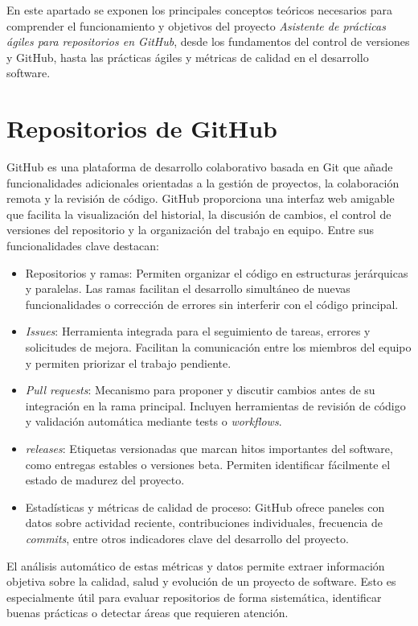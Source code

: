 
En este apartado se exponen los principales conceptos teóricos necesarios para comprender el funcionamiento y objetivos del proyecto \textit{Asistente de prácticas ágiles para repositorios en GitHub}, desde los fundamentos del control de versiones y GitHub, hasta las prácticas ágiles y métricas de calidad en el desarrollo software.

\section{Repositorios de GitHub}

GitHub es una plataforma de desarrollo colaborativo basada en Git que añade funcionalidades adicionales orientadas a la gestión de proyectos, la colaboración remota y la revisión de código. GitHub proporciona una interfaz web amigable que facilita la visualización del historial, la discusión de cambios, el control de versiones del repositorio y la organización del trabajo en equipo. Entre sus funcionalidades clave destacan:

\begin{itemize}
\item Repositorios y ramas: Permiten organizar el código en estructuras jerárquicas y paralelas. Las ramas facilitan el desarrollo simultáneo de nuevas funcionalidades o corrección de errores sin interferir con el código principal.
\item \textit{Issues}: Herramienta integrada para el seguimiento de tareas, errores y solicitudes de mejora. Facilitan la comunicación entre los miembros del equipo y permiten priorizar el trabajo pendiente.
\item \textit{Pull requests}: Mecanismo para proponer y discutir cambios antes de su integración en la rama principal. Incluyen herramientas de revisión de código y validación automática mediante tests o \textit{workflows}.
\item \textit{releases}: Etiquetas versionadas que marcan hitos importantes del software, como entregas estables o versiones beta. Permiten identificar fácilmente el estado de madurez del proyecto.
\item Estadísticas y métricas de calidad de proceso: GitHub ofrece paneles con datos sobre actividad reciente, contribuciones individuales, frecuencia de \textit{commits}, entre otros indicadores clave del desarrollo del proyecto.
\end{itemize}

El análisis automático de estas métricas y datos permite extraer información objetiva sobre la calidad, salud y evolución de un proyecto de software. Esto es especialmente útil para evaluar repositorios de forma sistemática, identificar buenas prácticas o detectar áreas que requieren atención.

